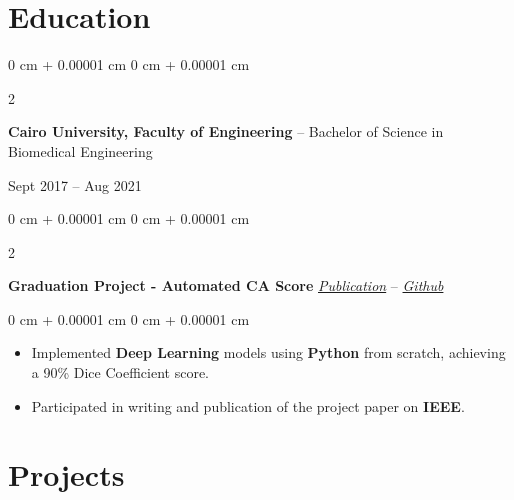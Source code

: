 \documentclass[10pt, letterpaper]{article}
\newenvironment{highlights}{
    \begin{itemize}[
        topsep=0.10 cm,
        parsep=0.10 cm,
        partopsep=0pt,
        itemsep=1pt,
        leftmargin=0 cm + 12pt
    ]
}{
    \end{itemize}
} %
\newenvironment{onecolentry}{
    \begin{adjustwidth}{
        0 cm + 0.00001 cm
    }{
        0 cm + 0.00001 cm
    }
}{
    \end{adjustwidth}
} %
\newenvironment{twocolentry}[2][]{
    \onecolentry
    \def\secondColumn{#2}
    \setcolumnwidth{\fill, 4.5 cm}
    \begin{paracol}{2}
}{
    \switchcolumn \raggedleft \secondColumn
    \end{paracol}
    \endonecolentry
} %
\begin{document}
        \vspace{0.1 cm}

    \section{Education}
        \begin{twocolentry}{
            Sept 2017 – Aug 2021
        }    
            \textbf{Cairo University, Faculty of Engineering} -- Bachelor of Science in Biomedical Engineering 
        \end{twocolentry}  
        \vspace{0.10 cm}

        \begin{twocolentry}{
            \href{https://ieeexplore.ieee.org/document/10510468}{\textit{Publication}} -- \href{https://github.com/Automated-CAD-Scoring-Suite/Automatic-CaScoring-From-Chest-CT}{\textit{Github}}
        }
            \textbf{Graduation Project - Automated CA Score }\end{twocolentry}

        \vspace{0.10 cm}
        \begin{onecolentry}
            \begin{highlights}
                \item Implemented \textbf{Deep Learning} models using \textbf{Python} from scratch, achieving a 90\% Dice Coefficient score.
                \item Participated in writing and publication of the project paper on \textbf{IEEE}. 
            \end{highlights}
        \end{onecolentry}
    \vspace{0.1 cm}

    \section{Projects}

\end{document}
